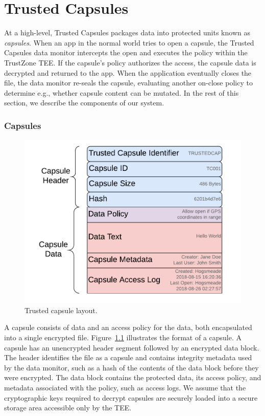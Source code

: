 \chapter{Trusted Capsules}
\label{ch:trustedcapsules}
At a high-level, Trusted Capsules packages data into protected units known as
    {\em capsules}. When an app in the normal world tries to open a capsule, the
Trusted Capsules data monitor intercepts the open and executes the policy within
the TrustZone TEE. If the capsule's policy authorizes the access, the capsule
data is decrypted and returned to the app. When the application eventually closes the file,
the data monitor re-seals the capsule, evaluating another on-close policy
to determine e.g., whether capsule content can be mutated. In the rest of this section,
we describe the components of our system.

\subsection{Capsules}

\begin{figure}
    \centering
    \includegraphics[width=\columnwidth]{fig/Fig2_Trusted_Capusle_Layout.pdf}
    \caption{Trusted capsule layout.}
    \label{fig:trustedcapsulelayout}
\end{figure}

A capsule consists of data and an access policy for the data, both encapsulated
into a single encrypted file. Figure~\ref{fig:trustedcapsulelayout} illustrates
the format of a capsule. A capsule has an unencrypted header segment followed by an
encrypted data block. The header identifies the file as a capsule and contains
integrity metadata used by the data monitor, such as a hash of the contents of
the data block before they were encrypted. The data block contains the protected
data, its access policy, and metadata associated with the policy, such as access
logs. We assume that the cryptographic keys required to decrypt capsules are
securely loaded into a secure storage area accessible only by the TEE.
%

